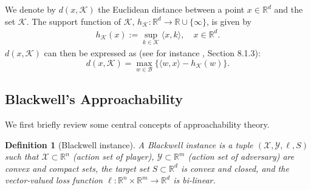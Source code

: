 \documentclass[a4paper,12pt]{article}
\newtheorem{lemma} {Lemma}
\newtheorem{definition} {Definition}
\newcommand{\mY}{\mathcal{Y}}
\newcommand{\mX}{\mathcal{X}}
\newcommand{\mB}{\mathcal{B}}
\newcommand{\mK}{\mathcal{K}}
\newcommand{\reals}{\mathbb{R}}
\begin{document}
We denote by $d(x, \mK)$ the Euclidean distance between a point $x \in \reals^d$ and the set $\mK$. The support function of $\mK$, $h_{\mK} : \reals^d \rightarrow \mathbb{R} \cup \{ \infty \}$, is given by
\begin{align}
\label{support function}
h_{\mK}(x):=\sup_{k \in \mK}\langle x , k \rangle, \quad x \in \reals^d.
\end{align} 
$d(x, \mK)$  can then be expressed as (see for instance \cite{boyd2004convex}, Section 8.1.3):
\begin{equation}\label{dif:dis}
d(x, \mK) = \max_{w \in \mB} \{ \langle w, x \rangle - h_{\mK}(w) \}.
\end{equation}

\subsection{Blackwell's Approachability}
We first briefly review some central concepts of approachability theory.
\begin{definition}[Blackwell instance] 
\label{blackwell instance}
A Blackwell instance is a tuple $(\mX,\mY,\ell,S)$ such that $\mX \subset \reals^n$ (action set of player), $\mY \subset \reals^m$ (action set of adversary) are convex and compact sets, the target set $S \subset \reals^d$ is convex and closed, and the vector-valued loss function $\ell :\reals ^n \times \reals ^m \to \reals ^d $ is bi-linear.
\end{definition}
\end{document}

